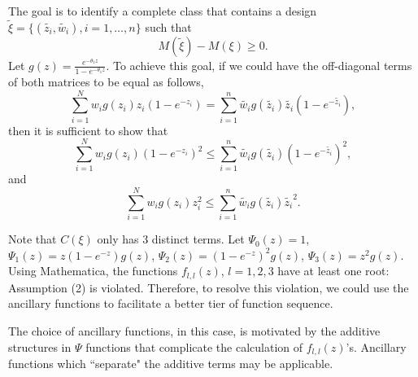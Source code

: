 \documentclass[12pt]{TD-CJS}
\begin{document}
The goal is to identify a complete class that contains a design $\tilde{\xi} = \{(\tilde{z_i},\tilde{w_i}), i=1,\ldots,n\}$ such that \[M(\tilde{\xi})-M(\xi)\ge0.\] Let $g(z) = \frac{e^{-\theta_1z}}{1-e^{-\theta_1z}}$. To achieve this goal, if we could have the off-diagonal terms of both matrices to be equal as follows,
\begin{equation}\label{eq: beta2_eq1}
\sum_{i=1}^{N} w_i g(z_i)z_i(1-e^{-z_i}) = \sum_{i=1}^{n} \tilde{w_i}  g(\tilde{z_i}) \tilde{z_i}(1-e^{-\tilde{z_i}}),
\end{equation}
then it is sufficient to show that 
\begin{equation}\label{eq: beta2_eq2}
\sum_{i=1}^{N} w_i  g(z_i)(1-e^{-z_i})^2 \le \sum_{i=1}^{n} \tilde{w_i} g(\tilde{z_i}) (1-e^{-\tilde{z_i}})^2,
\end{equation}
and
\begin{equation}\label{eq: beta2_eq3}
\sum_{i=1}^{N} w_i g(z_i)z_i^2 \le \sum_{i=1}^{n} \tilde{w_i}g(\tilde{z_i})\tilde{z_i}^2.
\end{equation} 

Note that $C(\xi)$ only has 3 distinct terms. Let $\Psi_0(z) = 1$, $\Psi_1(z) = z(1-e^{-z})g(z)$, $\Psi_2(z) = (1-e^{-z})^2g(z)$, $\Psi_3(z) = z^2g(z)$. 
Using Mathematica, the functions $f_{l,l}(z)$, $l=1,2,3$ have at least one root: Assumption (2) is violated. Therefore, to resolve this violation, we could use the ancillary functions to facilitate a better tier of function sequence. 

The choice of ancillary functions, in this case, is motivated by the additive structures in $\Psi$ functions that complicate the calculation of $f_{l,l}(z)$'s. Ancillary functions which ``separate" the additive terms may be applicable. 
\end{document}
